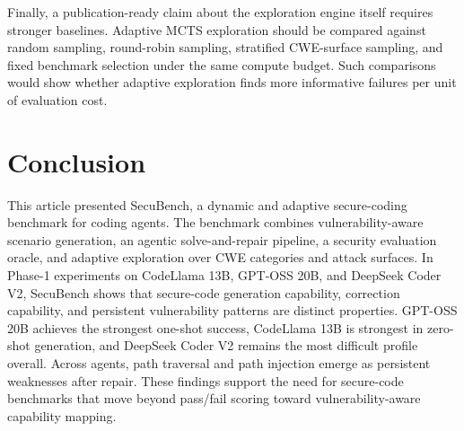 \documentclass[11pt]{article}
\newcommand{\toolname}{SecuBench}
\begin{document}
Finally, a publication-ready claim about the exploration engine itself requires stronger baselines. Adaptive MCTS exploration should be compared against random sampling, round-robin sampling, stratified CWE-surface sampling, and fixed benchmark selection under the same compute budget. Such comparisons would show whether adaptive exploration finds more informative failures per unit of evaluation cost.

\FloatBarrier
\section{Conclusion}

This article presented \toolname{}, a dynamic and adaptive secure-coding benchmark for coding agents. The benchmark combines vulnerability-aware scenario generation, an agentic solve-and-repair pipeline, a security evaluation oracle, and adaptive exploration over CWE categories and attack surfaces. In Phase-1 experiments on CodeLlama 13B, GPT-OSS 20B, and DeepSeek Coder V2, \toolname{} shows that secure-code generation capability, correction capability, and persistent vulnerability patterns are distinct properties. GPT-OSS 20B achieves the strongest one-shot success, CodeLlama 13B is strongest in zero-shot generation, and DeepSeek Coder V2 remains the most difficult profile overall. Across agents, path traversal and path injection emerge as persistent weaknesses after repair. These findings support the need for secure-code benchmarks that move beyond pass/fail scoring toward vulnerability-aware capability mapping.
\end{document}
